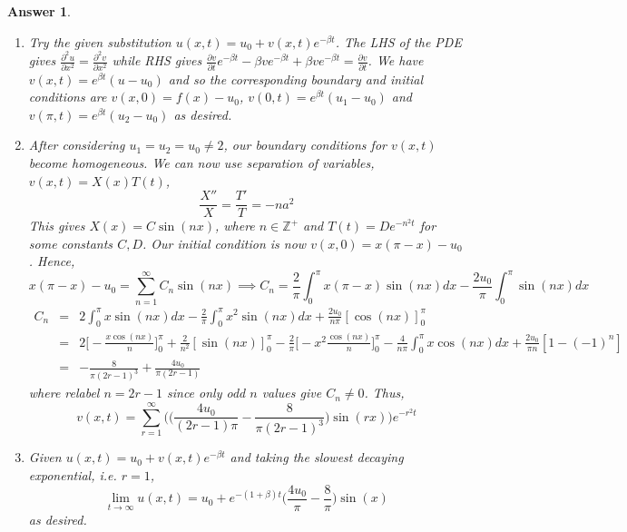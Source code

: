 \documentclass[a4paper]{article}
\newtheorem{ans}{Answer}[section]
\theoremstyle{new}
\begin{document}
\begin{ans}\leavevmode
\begin{enumerate}[label=(\alph*)]
    \item Try the given substitution $u(x,t)=u_0+v(x,t)e^{-\beta t}$. The LHS of the PDE gives $\frac{\partial^2u}{\partial x^2}=\frac{\partial^2v}{\partial x^2}$ while RHS gives $\frac{\partial v}{\partial t}e^{-\beta t}-\beta ve^{-\beta t}+\beta ve^{-\beta t}=\frac{\partial v}{\partial t}$. We have $v(x,t)=e^{\beta t}(u-u_0)$ and so the corresponding boundary and initial conditions are $v(x,0)=f(x)-u_0$, $v(0,t)=e^{\beta t}(u_1-u_0)$ and $v(\pi,t)=e^{\beta t}(u_2-u_0)$ as desired.
    \item  After considering $u_1=u_2=u_0\neq 2$, our boundary conditions for $v(x,t)$ become homogeneous. We can now use separation of variables, $v(x,t)=X(x)T(t)$,
$$\frac{X''}{X}=\frac{T'}{T}=-na^2$$
This gives $X(x)=C\sin(nx)$, where $n\in\mathbb{Z}^+$ and $T(t)=De^{-n^2t}$ for some constants $C,D$. Our initial condition is now $v(x,0)=x(\pi-x)-u_0$. Hence,
$$x(\pi-x)-u_0=\sum_{n=1}^\infty C_n\sin(nx)\implies C_n=\frac{2}{\pi}\int_{0}^\pi x(\pi-x)\sin(nx)dx-\frac{2u_0}{\pi}\int_{0}^{\pi}\sin(nx)dx$$
\begin{eqnarray}
 C_n&=&2\int_0^\pi x\sin(nx)dx-\frac{2}{\pi}\int_0^\pi x^2\sin(nx)dx+\frac{2u_0}{n\pi}[\cos(nx)]_{0}^\pi\nonumber\\&=&2\bigg[-\frac{x\cos(nx)}{n}\bigg]_{0}^\pi+\frac{2}{n^2}[\sin(nx)]_{0}^\pi-\frac{2}{\pi}\bigg[-x^2\frac{\cos(nx)}{n}\bigg]_{0}^\pi-\frac{4}{n\pi }\int_{0}^\pi x\cos(nx)dx+\frac{2u_0}{\pi n}[1-(-1)^n]\nonumber\\&=&-\frac{8}{\pi(2r-1)^3}+\frac{4u_0}{\pi(2r-1)}\nonumber
\end{eqnarray}
where relabel $n=2r-1$ since only odd $n$ values give $C_n\neq 0$. Thus, 
$$v(x,t)=\sum_{r=1}^\infty\bigg(\bigg(\frac{4u_0}{(2r-1)\pi}-\frac{8}{\pi(2r-1)^3}\bigg)\sin(r x)\bigg)e^{-r^2t}$$
\item Given $u(x,t)=u_0+v(x,t)e^{-\beta t}$ and taking the slowest decaying exponential, i.e. $r=1$,
$$\lim_{t\rightarrow\infty}u(x,t)=u_0+e^{-(1+\beta)t}\bigg(\frac{4u_0}{\pi}-\frac{8}{\pi}\bigg)\sin(x)$$
as desired.
\end{enumerate}
\end{ans}
\end{document}
